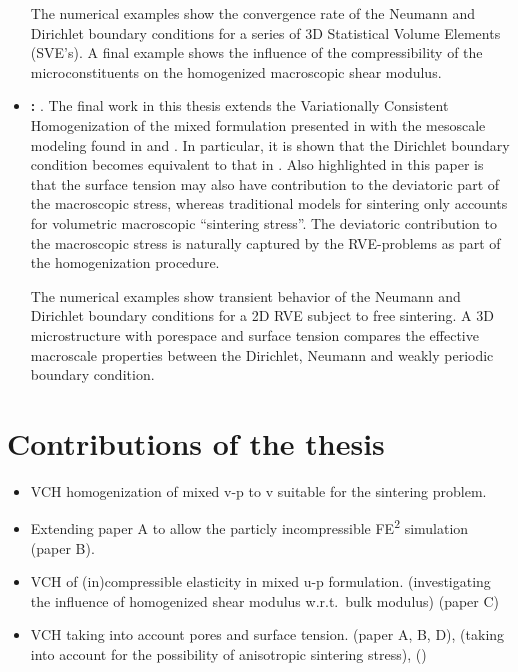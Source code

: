 \documentclass[MikaelDissertation.tex]{subfiles}
\begin{document}
\begin{itemize}
The numerical examples show the convergence rate of the Neumann and Dirichlet boundary conditions for a series of 3D Statistical Volume Elements (SVE's).
A final example shows the influence of the compressibility of the microconstituents on the homogenized macroscopic shear modulus.

 \item \textbf{: }.
The final work in this thesis extends the Variationally Consistent Homogenization of the mixed formulation presented in  with the mesoscale modeling found in  and .
In particular, it is shown that the Dirichlet boundary condition becomes equivalent to that in .
Also highlighted in this paper is that the surface tension may also have contribution to the deviatoric part of the macroscopic stress, whereas traditional models for sintering only accounts for volumetric macroscopic ``sintering stress''.
The deviatoric contribution to the macroscopic stress is naturally captured by the RVE-problems as part of the homogenization procedure.

The numerical examples show transient behavior of the Neumann and Dirichlet boundary conditions for a 2D RVE subject to free sintering.
A 3D microstructure with porespace and surface tension compares the effective macroscale properties between the Dirichlet, Neumann and weakly periodic boundary condition.
\end{itemize}


\chapter{Contributions of the thesis}
\begin{itemize}
 \item VCH homogenization of mixed v-p to v suitable for the sintering problem.
 \item Extending paper A to allow the particly incompressible FE\textsuperscript{2} simulation (paper B).
 \item VCH of (in)compressible elasticity in mixed u-p formulation.
  (investigating the influence of homogenized shear modulus w.r.t.\ bulk modulus) (paper C)
 \item VCH taking into account pores and surface tension. (paper A, B, D),
  (taking into account for the possibility of anisotropic sintering stress), ()
\end{itemize}
\end{document}
